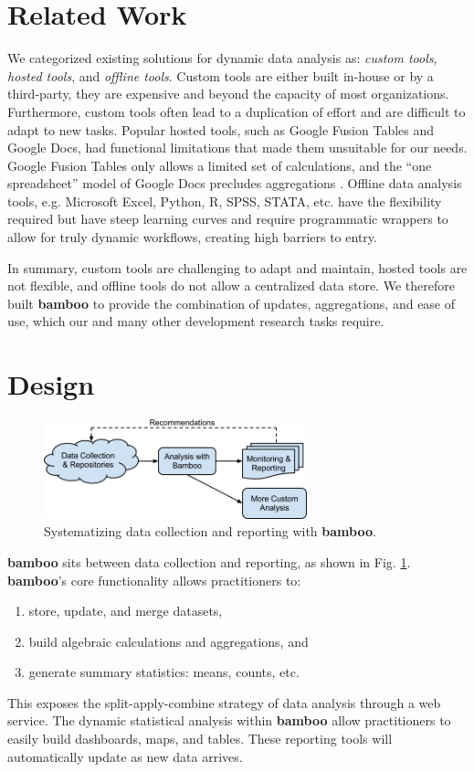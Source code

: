 \documentclass{sig-alternate}
\begin{document}
\section{Related Work}
We categorized existing solutions for dynamic data
analysis as: \emph{custom tools}, \emph{hosted tools}, and \emph{offline tools}.  Custom tools are
either built in-house or by a third-party, they are expensive and beyond the
capacity of most organizations. Furthermore, custom tools often lead to
a duplication of effort and are difficult to adapt to new tasks.  Popular hosted
tools, such as Google Fusion Tables and Google Docs, had functional limitations
that made them unsuitable for our needs.  Google Fusion Tables only allows a limited set of
calculations, and the ``one spreadsheet'' model of Google Docs precludes
aggregations \cite{gonzalez2}.  Offline data analysis tools, e.g. Microsoft Excel, Python, R, SPSS, STATA, etc. have the flexibility required but have steep learning curves and require programmatic wrappers to allow for truly dynamic workflows, creating high barriers to entry.

In summary, custom tools are challenging to adapt and maintain, hosted tools are
not flexible, and offline tools do not allow a centralized data store.
We therefore built \textbf{bamboo} to provide the combination of
updates, aggregations, and ease of use, which our and many other development research tasks
require.

\section{Design}

\begin{figure}
\centering
\includegraphics[width=3in]{figures/bamboo_flow}
\caption{Systematizing data collection and reporting with \textbf{bamboo}.}
\label{fig:flow}
\end{figure}

\textbf{bamboo} sits between data collection and reporting, as shown in Fig.
\ref{fig:flow}.
\textbf{bamboo}'s core functionality allows
practitioners to:
\begin{enumerate}
\item store, update, and merge datasets,
\item build algebraic calculations and aggregations, and
\item generate summary statistics: means, counts, etc.
\end{enumerate}
This exposes the split-apply-combine strategy of data analysis
\cite{wickham} through a web service.
The dynamic statistical analysis within \textbf{bamboo} allow practitioners to easily build
dashboards, maps, and tables.  These reporting tools will automatically update as new data
arrives.
\end{document}
